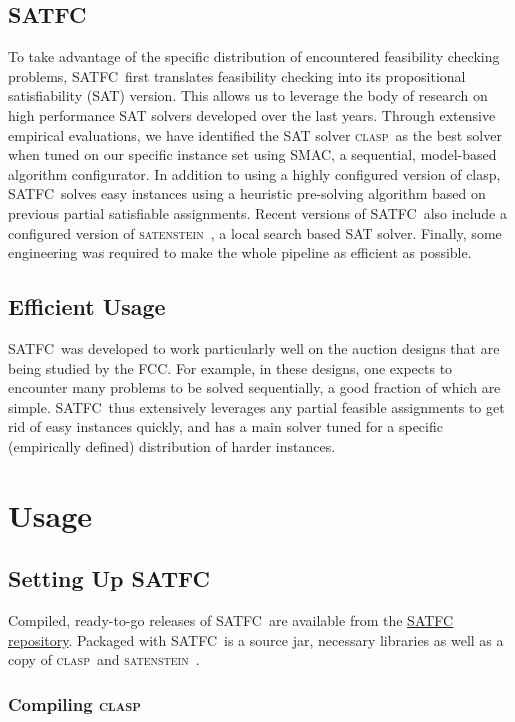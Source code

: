 \documentclass[
10pt, %
letterpaper, %
oneside, %
headinclude,footinclude, %
BCOR5mm, %
needspace, %
]{scrartcl}
\newcommand{\SATFC}{\textsc{SATFC}~}
\newcommand{\clasp}{\textsc{clasp}~}
\newcommand{\satenstein}{\textsc{satenstein}~}
\begin{document}
\subsection{\SATFC}
To take advantage of the specific distribution of encountered feasibility checking problems, \SATFC first translates feasibility checking into its propositional satisfiability (SAT) version. This allows us to leverage the body of research on high performance SAT solvers developed over the last years. Through extensive empirical evaluations, we have identified the SAT solver \clasp as the best solver when tuned on our specific instance set using SMAC, a sequential, model-based algorithm configurator. In addition to using a highly configured version of clasp, \SATFC solves easy instances using a heuristic pre-solving algorithm based on previous partial satisfiable assignments. Recent versions of \SATFC also include a configured version of \satenstein, a local search based SAT solver. Finally, some engineering was required to make the whole pipeline as efficient as possible.

\subsection{Efficient Usage}
\SATFC was developed to work particularly well on the auction designs that are being studied by the FCC. For example, in these designs, one expects to encounter many problems to be solved sequentially, a good fraction of which are simple. \SATFC thus extensively leverages any partial feasible assignments to get rid of easy instances quickly, and has a main solver tuned for a specific (empirically defined) distribution of harder instances.

\section{Usage}\label{sec:usage}

\subsection{Setting Up \SATFC}

Compiled, ready-to-go releases of \SATFC are available from the \href{https://github.com/FCC/SATFC/releases}{SATFC  repository}. Packaged with \SATFC is a source jar, necessary libraries as well as a copy of \clasp and \satenstein.

\subsubsection{Compiling \clasp}
\end{document}
